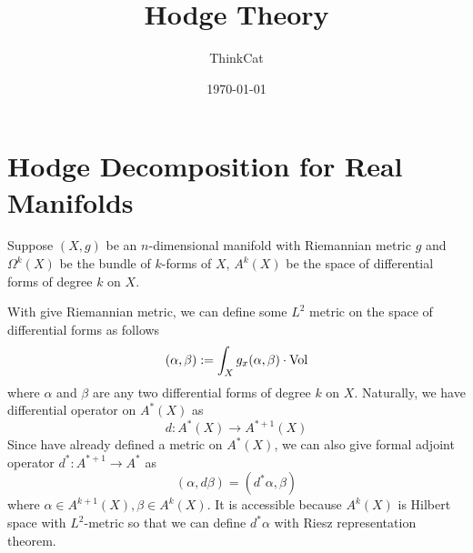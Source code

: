 \documentclass[oneside,a4paper]{amsart}
\title{Hodge Theory}
\author{ThinkCat}
\date{\today}
\begin{document}
\maketitle
\tableofcontents
\section{Hodge Decomposition for Real Manifolds}
Suppose $(X,g)$ be an $n$-dimensional manifold with Riemannian metric $g$ and $\Omega^k (X)$ be the bundle of $k$-forms of $X$, $A^k (X)$ be the space of differential forms of degree $k$ on $X$.

With give Riemannian metric, we can define some $L^2$ metric on the space of differential forms as follows
$$
(\alpha, \beta) := \int_{X} g_x(\alpha, \beta) \cdot \operatorname*{Vol}   
$$
where $\alpha$ and $\beta$ are any two differential forms of degree $k$ on $X$. Naturally, we have differential operator on $A^*(X)$ as
$$
d: A^*(X) \rightarrow A^{*+1}(X)
$$
Since have already defined a metric on $A^*(X)$,  we can also give formal adjoint operator $d^*: A^{*+1} \rightarrow A^*$ as
$$
(\alpha, d\beta)=(d^*\alpha, \beta)
$$
where $\alpha \in A^{k+1}(X), \beta \in A^k(X)$. It is accessible because $A^k(X)$ is Hilbert space with $L^2$-metric so that we can define $d^* \alpha$ with Riesz representation theorem.
\end{document}
